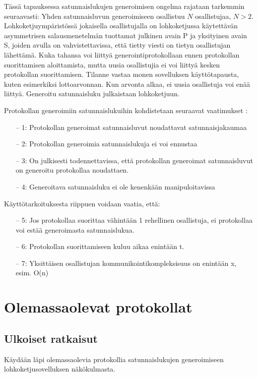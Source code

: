 \documentclass{article}
\begin{document}
Tässä tapauksessa satunnaislukujen generoimisen ongelma rajataan tarkemmin seuraavasti:
Yhden satunnaisluvun generoimiseen osallistuu $N$ osallistujaa,  $N > 2$. Lohkoketjuympäristössä jokaisella osallistujalla on lohkoketjussa käytettävän asymmetrisen salausmenetelmän tuottamat julkinen avain P ja yksityinen avain S, joiden avulla on vahvistettavissa, että tietty viesti on tietyn osallistujan lähettämä. Kuka tahansa voi liittyä generointiprotokollaan ennen protokollan suorittamisen aloittamista, mutta uusia osallistujia ei voi liittyä kesken protokollan suorittamisen. Tilanne vastaa monen sovelluksen käyttötapausta, kuten esimerkiksi lottoarvonnan. Kun arvonta alkaa, ei uusia osallistuja voi enää liittyä. Generoitu satunnaisluku julkaistaan lohkoketjuun. 

Protokollan generoimiin satunnaislukuihin kohdistetaan seuraavat vaatimukset \cite{simic_review_2020}:
\begin{itemize}
    \item[--] 1: Protokollan generoimat satunnaisluvut noudattavat satunnaisjakaumaa
    \item[--] 2: Protokollan generoimia satunnaislukuja ei voi ennustaa
    \item[--] 3: On julkisesti todennettavissa, että protokollan generoimat satunnaisluvut on generoitu protokollaa noudattaen.
    \item[--] 4: Generoitava satunnaisluku ei ole kenenkään manipuloitavissa
\end{itemize}\textbf{}
Käyttötarkoituksesta riippuen voidaan vaatia, että:

\begin{itemize}
    \item[--] 5: Jos protokollaa suorittaa vähintään 1 rehellinen osallistuja, ei protokollaa voi estää generoimasta satunnaislukua.
    \item[--] 6: Protokollan suorittamiseen kuluu aikaa enintään t.
    \item[--] 7: Yksittäisen osallistujan kommunikointikompleksisuus on enintään x, esim. O(n)
\end{itemize}

\section{Olemassaolevat protokollat}

\subsection{Ulkoiset ratkaisut}
Käydään läpi olemassaolevia protokollia satunnaislukujen generoimiseen lohkoketjusovelluksen näkökulmasta. 
\end{document}
